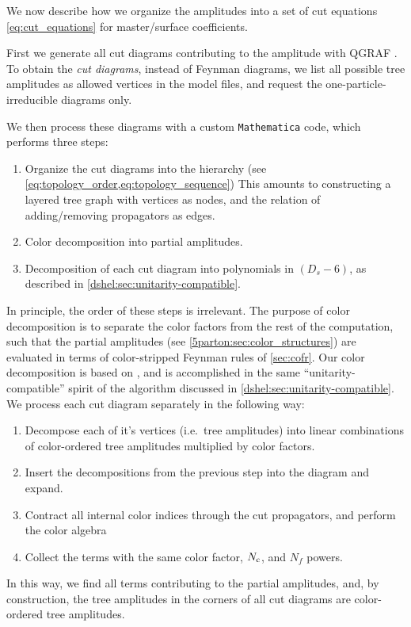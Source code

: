 We now describe how we organize the amplitudes into a set of cut equations \cref{eq:cut_equations} for master/surface coefficients.

First we generate all cut diagrams contributing to the amplitude with \textsc{QGRAF} \cite{Nogueira:1991ex}.
To obtain the \emph{cut diagrams}, instead of Feynman diagrams,
we list all possible tree amplitudes as allowed vertices in the model files,
and request the one-particle-irreducible diagrams only.

We then process these diagrams with a custom  \texttt{Mathematica} code, which performs three steps:
\begin{enumerate}
  \item Organize the cut diagrams into the hierarchy (see \cref{eq:topology_order,eq:topology_sequence}) 
    This amounts to constructing a layered tree graph with vertices as nodes,
    and the relation of adding/removing propagators as edges.
  \item Color decomposition into partial amplitudes.
  \item Decomposition of each cut diagram into polynomials in $(D_s-6)$, as described in \cref{dshel:sec:unitarity-compatible}.
\end{enumerate}
In principle, the order of these steps is irrelevant.
The purpose of color decomposition is to separate the color factors from the rest of the computation, 
such that  the partial amplitudes (see \cref{5parton:sec:color_structures}) are evaluated in terms of color-stripped Feynman rules of \cref{sec:cofr}.
Our color decomposition is based on \cite{Ochirov:2016ewn,Ochirov:2019mtf},
and is accomplished in the same ``unitarity-compatible'' spirit of the algorithm discussed in \cref{dshel:sec:unitarity-compatible}.
We process each cut diagram separately in the following way:
\begin{enumerate}
  \item Decompose each of it's vertices (i.e.\ tree amplitudes) into linear combinations of color-ordered tree amplitudes multiplied by color factors.
  \item Insert the decompositions from the previous step into the diagram and expand.
  \item Contract all internal color indices through the cut propagators, and perform the color algebra
  \item Collect the terms with the same color factor, $N_\mathrm{c}$, and $N_ f$ powers. 
\end{enumerate}
In this way, we find all terms contributing to the partial amplitudes,
and, by construction, the tree amplitudes in the corners of all cut diagrams are color-ordered tree amplitudes.



